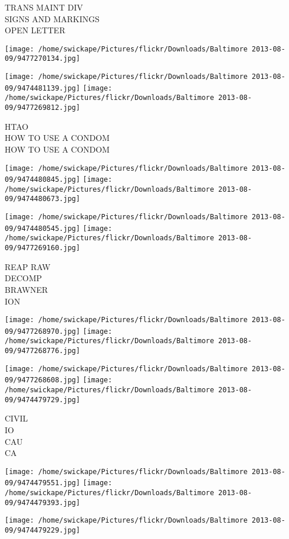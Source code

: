 \documentclass[10pt,letterpaper]{article}
\begin{document}
TRANS MAINT DIV\\
SIGNS AND MARKINGS\\
OPEN LETTER
\pagebreak

\texttt{[image: /home/swickape/Pictures/flickr/Downloads/Baltimore 2013-08-09/9477270134.jpg]}

\vspace{0.25in}
\texttt{[image: /home/swickape/Pictures/flickr/Downloads/Baltimore 2013-08-09/9474481139.jpg]}
\texttt{[image: /home/swickape/Pictures/flickr/Downloads/Baltimore 2013-08-09/9477269812.jpg]}

HTAO\\
HOW TO USE A CONDOM\\
HOW TO USE A CONDOM
\pagebreak

\texttt{[image: /home/swickape/Pictures/flickr/Downloads/Baltimore 2013-08-09/9474480845.jpg]}
\texttt{[image: /home/swickape/Pictures/flickr/Downloads/Baltimore 2013-08-09/9474480673.jpg]}

\texttt{[image: /home/swickape/Pictures/flickr/Downloads/Baltimore 2013-08-09/9474480545.jpg]}
\texttt{[image: /home/swickape/Pictures/flickr/Downloads/Baltimore 2013-08-09/9477269160.jpg]}

REAP RAW\\
DECOMP\\
BRAWNER\\
ION
\pagebreak

\texttt{[image: /home/swickape/Pictures/flickr/Downloads/Baltimore 2013-08-09/9477268970.jpg]}
\texttt{[image: /home/swickape/Pictures/flickr/Downloads/Baltimore 2013-08-09/9477268776.jpg]}

\texttt{[image: /home/swickape/Pictures/flickr/Downloads/Baltimore 2013-08-09/9477268608.jpg]}
\texttt{[image: /home/swickape/Pictures/flickr/Downloads/Baltimore 2013-08-09/9474479729.jpg]}

CIVIL\\
IO\\
CAU\\
CA
\pagebreak

\texttt{[image: /home/swickape/Pictures/flickr/Downloads/Baltimore 2013-08-09/9474479551.jpg]}
\texttt{[image: /home/swickape/Pictures/flickr/Downloads/Baltimore 2013-08-09/9474479393.jpg]}

\texttt{[image: /home/swickape/Pictures/flickr/Downloads/Baltimore 2013-08-09/9474479229.jpg]}
\end{document}
